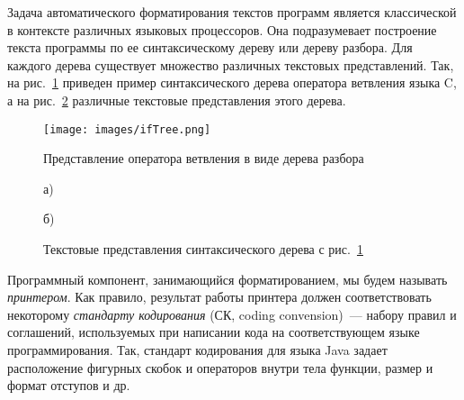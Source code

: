 Задача автоматического форматирования текстов программ является классической в контексте различных языковых процессоров.
Она подразумевает построение текста программы по ее синтаксическому дереву или дереву разбора.
Для каждого дерева существует множество различных текстовых представлений.
Так, на рис.~\ref{fig:ifTree} приведен пример синтаксического дерева оператора ветвления языка C, а на рис.~\ref{intro:treeToCode} различные текстовые представления этого дерева.
\begin{figure}[h]
	\centering
	\texttt{[image: images/ifTree.png]}
	\caption{Представление оператора ветвления в виде дерева разбора}
	\label{fig:ifTree}
\end{figure}
\noindent
{}
\begin{figure}[ht]
  \noindent
  \begin{minipage}{.4\textwidth}
    
    \caption*{а) }    
  \end{minipage}
  \hfill
  \begin{minipage}{.5\textwidth}
    
    \caption*{б)}    
  \end{minipage}
  \caption{Текстовые представления синтаксического дерева с рис.~\ref{fig:ifTree}}
  \label{intro:treeToCode}
\end{figure}
\noindent
Программный компонент, занимающийся форматированием, мы будем называть \emph{принтером}.
Как правило, результат работы принтера должен соответствовать некоторому \emph{стандарту кодирования} (СК, coding convension)~--- набору правил и соглашений, используемых при написании кода на соответствующем языке программирования.
Так, стандарт кодирования для языка Java задает расположение фигурных скобок и операторов внутри тела функции, размер и формат отступов и др.

